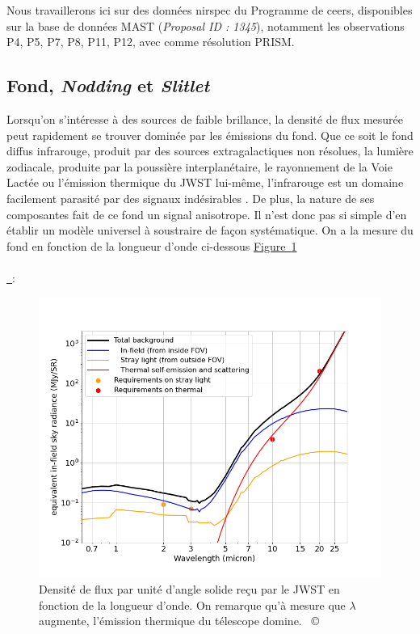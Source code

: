 \documentclass[12pt, a4paper]{article}
\newcommand{\customcite}[1]{\mbox{
  {\small \copyright} \cite{#1}}
}
\newcommand*{\figref}[2][]{%
  \hyperref[{#2}]{%
    Figure~\ref*{#2}%
    \ifx\\#1\\%
    \else
      \,#1%
    \fi
  }%
}
\begin{document}
Nous travaillerons ici sur des données \gls{nirspec} du Programme de \gls{ceers}, disponibles sur la base de données MAST  (\textit{Proposal ID : 1345}), notamment les observations P4, P5, P7, P8, P11, P12, avec comme résolution PRISM.

\subsection{Fond, \textit{Nodding} et \textit{Slitlet}}

Lorsqu'on s'intéresse à des sources de faible brillance, la densité de flux mesurée peut rapidement se trouver dominée par les émissions du fond. Que ce soit le fond diffus infrarouge, produit par des sources extragalactiques non résolues, la lumière zodiacale, produite par la poussière interplanétaire, le rayonnement de la Voie Lactée ou l'émission thermique du JWST lui-même, l'infrarouge est un domaine facilement parasité par des signaux indésirables . De plus, la nature de ses composantes fait de ce fond un signal anisotrope. Il n'est donc pas si simple d'en établir un modèle universel à soustraire de façon systématique. On a la mesure du fond en fonction de la longueur d'onde ci-dessous \figref{fig:background_jwst} : 

\begin{figure}[!h]
  \centering
  \includegraphics[scale=0.55]{assets/background_jwst.png}
  \caption{Densité de flux par unité d'angle solide reçu par le JWST en fonction de la longueur d'onde. On remarque qu'à mesure que $\lambda$ augmente, l'émission thermique du télescope domine. \customcite{jwst_background}}
  \label{fig:background_jwst}
\end{figure}
\end{document}
